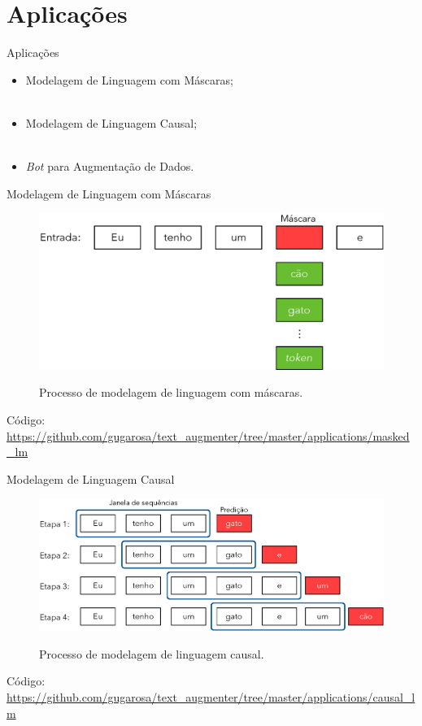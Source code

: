 \section{Aplicações}
\label{s.application}

\begin{frame}{Aplicações}
	\begin{itemize}
		\justifying
		\item Modelagem de Linguagem com Máscaras;
		\\~\\
		\item Modelagem de Linguagem Causal;	
		\\~\\
		\item \emph{Bot} para Augmentação de Dados.
	\end{itemize}
\end{frame}

\begin{frame}{Modelagem de Linguagem com Máscaras}
	\begin{figure}[!ht]
		\centering
		\includegraphics[scale=0.45]{figs/masked_lm.eps}	
		\label{f.masked_lm}
		\caption{Processo de modelagem de linguagem com máscaras.}
	\end{figure}
	Código: \url{https://github.com/gugarosa/text_augmenter/tree/master/applications/masked_lm}
\end{frame}

\begin{frame}{Modelagem de Linguagem Causal}	
	\begin{figure}[!ht]
		\centering
		\includegraphics[scale=0.425]{figs/text_generation.eps}	
		\label{f.causal_lm}
		\caption{Processo de modelagem de linguagem causal.}
	\end{figure}
	Código: \url{https://github.com/gugarosa/text_augmenter/tree/master/applications/causal_lm}
\end{frame}

